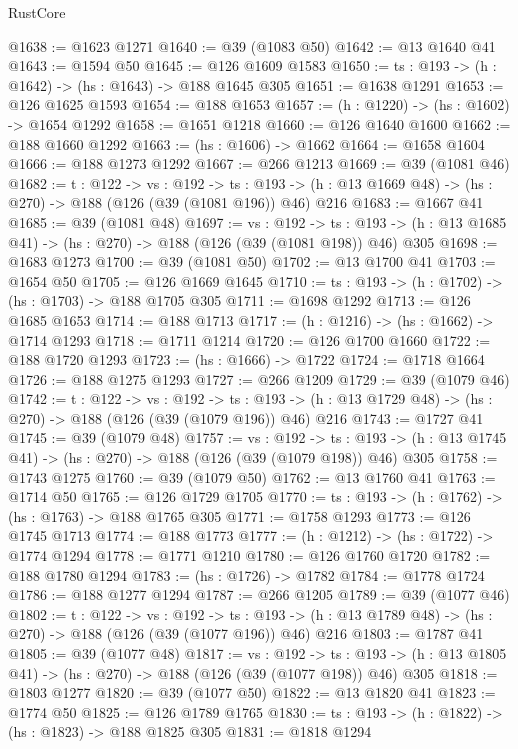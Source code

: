 \begin{lexlean}{RustCore}
\begin{coremodule}
@1638 := @1623 @1271
@1640 := @39 (@1083 @50)
@1642 := @13 @1640 @41
@1643 := @1594 @50
@1645 := @126 @1609 @1583
@1650 := {ts : @193} -> (h : @1642) -> (hs : @1643) -> @188 @1645 @305
@1651 := @1638 @1291
@1653 := @126 @1625 @1593
@1654 := @188 @1653
@1657 := (h : @1220) -> (hs : @1602) -> @1654 @1292
@1658 := @1651 @1218
@1660 := @126 @1640 @1600
@1662 := @188 @1660 @1292
@1663 := (hs : @1606) -> @1662
@1664 := @1658 @1604
@1666 := @188 @1273 @1292
@1667 := @266 @1213
@1669 := @39 (@1081 @46)
@1682 := {t : @122} ->
  {vs : @192} ->
  {ts : @193} -> (h : @13 @1669 @48) -> (hs : @270) -> @188 (@126 (@39 (@1081 @196)) @46) @216
@1683 := @1667 @41
@1685 := @39 (@1081 @48)
@1697 := {vs : @192} ->
  {ts : @193} -> (h : @13 @1685 @41) -> (hs : @270) -> @188 (@126 (@39 (@1081 @198)) @46) @305
@1698 := @1683 @1273
@1700 := @39 (@1081 @50)
@1702 := @13 @1700 @41
@1703 := @1654 @50
@1705 := @126 @1669 @1645
@1710 := {ts : @193} -> (h : @1702) -> (hs : @1703) -> @188 @1705 @305
@1711 := @1698 @1292
@1713 := @126 @1685 @1653
@1714 := @188 @1713
@1717 := (h : @1216) -> (hs : @1662) -> @1714 @1293
@1718 := @1711 @1214
@1720 := @126 @1700 @1660
@1722 := @188 @1720 @1293
@1723 := (hs : @1666) -> @1722
@1724 := @1718 @1664
@1726 := @188 @1275 @1293
@1727 := @266 @1209
@1729 := @39 (@1079 @46)
@1742 := {t : @122} ->
  {vs : @192} ->
  {ts : @193} -> (h : @13 @1729 @48) -> (hs : @270) -> @188 (@126 (@39 (@1079 @196)) @46) @216
@1743 := @1727 @41
@1745 := @39 (@1079 @48)
@1757 := {vs : @192} ->
  {ts : @193} -> (h : @13 @1745 @41) -> (hs : @270) -> @188 (@126 (@39 (@1079 @198)) @46) @305
@1758 := @1743 @1275
@1760 := @39 (@1079 @50)
@1762 := @13 @1760 @41
@1763 := @1714 @50
@1765 := @126 @1729 @1705
@1770 := {ts : @193} -> (h : @1762) -> (hs : @1763) -> @188 @1765 @305
@1771 := @1758 @1293
@1773 := @126 @1745 @1713
@1774 := @188 @1773
@1777 := (h : @1212) -> (hs : @1722) -> @1774 @1294
@1778 := @1771 @1210
@1780 := @126 @1760 @1720
@1782 := @188 @1780 @1294
@1783 := (hs : @1726) -> @1782
@1784 := @1778 @1724
@1786 := @188 @1277 @1294
@1787 := @266 @1205
@1789 := @39 (@1077 @46)
@1802 := {t : @122} ->
  {vs : @192} ->
  {ts : @193} -> (h : @13 @1789 @48) -> (hs : @270) -> @188 (@126 (@39 (@1077 @196)) @46) @216
@1803 := @1787 @41
@1805 := @39 (@1077 @48)
@1817 := {vs : @192} ->
  {ts : @193} -> (h : @13 @1805 @41) -> (hs : @270) -> @188 (@126 (@39 (@1077 @198)) @46) @305
@1818 := @1803 @1277
@1820 := @39 (@1077 @50)
@1822 := @13 @1820 @41
@1823 := @1774 @50
@1825 := @126 @1789 @1765
@1830 := {ts : @193} -> (h : @1822) -> (hs : @1823) -> @188 @1825 @305
@1831 := @1818 @1294

\end{coremodule}
\end{lexlean}
